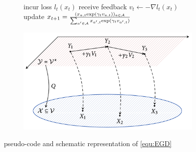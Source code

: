 \begin{figure}[H]
\centering
\begin{subfigure}{.5\textwidth}
    \begin{algorithm}[H]
    \DontPrintSemicolon
     {
    incur loss $l_t(x_t)$ \;
    receive feedback $v_t \gets -\nabla l_t(x_t)$ \;
    update $x_{t+1} = \frac{(x_{a,t}\textnormal{exp}(\gamma_t v_{a,t}))_{a\in\mathcal{A}}}{\sum_{a'\in\mathcal{A}}x_{a',t}\textnormal{exp}(\gamma_t v_{a',t})}$ \;
    }
    \end{algorithm}
\end{subfigure}%
\begin{subfigure}{.5\textwidth}
  \centering
  \includegraphics[width=\textwidth]{logos/EGDscheme.png}
\end{subfigure}
\caption{pseudo-code and schematic representation of \ref{equ:EGD}}
\label{fig:EGDpseudoCodeAndScheme}
\end{figure}

